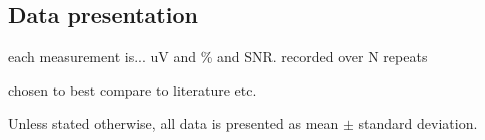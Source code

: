 \subsection{Data presentation}
each measurement is...
uV and \% and SNR. recorded over N repeats

chosen to best compare to literature etc.

Unless stated otherwise, all data is presented as mean $\pm$ standard deviation. 